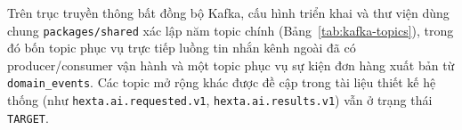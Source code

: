 Trên trục truyền thông bất đồng bộ Kafka, cấu hình triển khai và thư viện dùng chung \texttt{packages/\hspace{0pt}shared} xác lập năm topic chính (Bảng~\ref{tab:kafka-topics}), trong đó bốn topic phục vụ trực tiếp luồng tin nhắn kênh ngoài đã có producer/consumer vận hành và một topic phục vụ sự kiện đơn hàng xuất bản từ \texttt{domain\_\hspace{0pt}events}.
Các topic mở rộng khác được đề cập trong tài liệu thiết kế hệ thống (như \texttt{hexta.\hspace{0pt}ai.\hspace{0pt}requested.\hspace{0pt}v1}, \texttt{hexta.\hspace{0pt}ai.\hspace{0pt}results.\hspace{0pt}v1}) vẫn ở trạng thái \texttt{TARGET}.

